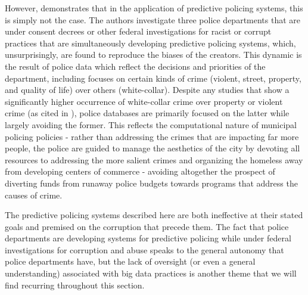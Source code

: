However, \cite{richardson2019DirtyData} demonstrates that in the
application of predictive policing systems, this is simply not the
case. The authors investigate three police departments that are under
consent decrees or other federal investigations for racist or corrupt
practices that are simultaneously developing predictive policing
systems, which, unsurprisingly, are found to reproduce the biases of
the creators. This dynamic is the result of police data which reflect
the decisions and priorities of the department, including focuses on
certain kinds of crime (violent, street, property, and quality of
life) over others (white-collar). Despite any studies that show a
significantly higher occurrence of white-collar crime over property or
violent crime (as cited in \cite{richardson2019DirtyData}), police
databases are primarily focused on the latter while largely avoiding
the former. This reflects the computational nature of municipal
policing policies - rather than addressing the crimes that are
impacting far more people, the police are guided to manage the
aesthetics of the city by devoting all resources to addressing the
more salient crimes and organizing the homeless away from developing
centers of commerce - avoiding altogether the prospect of diverting
funds from runaway police budgets towards programs that address the
causes of crime.

The predictive policing systems described here are both ineffective at
their stated goals and premised on the corruption that precede
them. The fact that police departments are developing systems for
predictive policing while under federal investigations for corruption
and abuse speaks to the general autonomy that police departments have,
but the lack of oversight (or even a general understanding) associated
with big data practices is another theme that we will find recurring
throughout this section.

